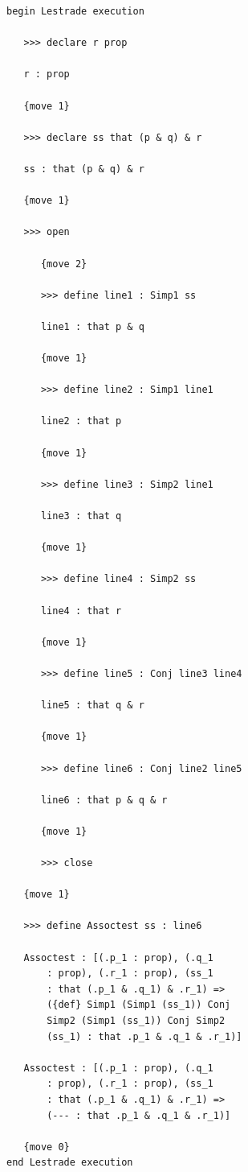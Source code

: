\documentclass[12pt]{article}
\begin{document}
\begin{verbatim}
begin Lestrade execution

   >>> declare r prop

   r : prop

   {move 1}

   >>> declare ss that (p & q) & r

   ss : that (p & q) & r

   {move 1}

   >>> open

      {move 2}

      >>> define line1 : Simp1 ss

      line1 : that p & q

      {move 1}

      >>> define line2 : Simp1 line1

      line2 : that p

      {move 1}

      >>> define line3 : Simp2 line1

      line3 : that q

      {move 1}

      >>> define line4 : Simp2 ss

      line4 : that r

      {move 1}

      >>> define line5 : Conj line3 line4

      line5 : that q & r

      {move 1}

      >>> define line6 : Conj line2 line5

      line6 : that p & q & r

      {move 1}

      >>> close

   {move 1}

   >>> define Assoctest ss : line6

   Assoctest : [(.p_1 : prop), (.q_1 
       : prop), (.r_1 : prop), (ss_1 
       : that (.p_1 & .q_1) & .r_1) => 
       ({def} Simp1 (Simp1 (ss_1)) Conj 
       Simp2 (Simp1 (ss_1)) Conj Simp2 
       (ss_1) : that .p_1 & .q_1 & .r_1)]

   Assoctest : [(.p_1 : prop), (.q_1 
       : prop), (.r_1 : prop), (ss_1 
       : that (.p_1 & .q_1) & .r_1) => 
       (--- : that .p_1 & .q_1 & .r_1)]

   {move 0}
end Lestrade execution


\end{verbatim}
\end{document}
